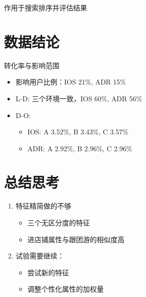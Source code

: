 \documentclass{beamer}
\begin{document}
\begin{CJK}{UTF8}{gbsn}
\begin{frame}{作用于搜索排序并评估结果}
\end{frame}

\section{数据结论}

\begin{frame}{转化率与影响范围}
  \begin{itemize}
  \item {影响用户比例：IOS 21\%, ADR 15\%}
  \item {L-D: 三个环境一致，IOS 60\%, ADR 56\%}
  \item {
    D-O:
    \begin{itemize}
    \item {IOS: A 3.52\%, B 3.43\%, C 3.57\%}
    \item {ADR: A 2.92\%, B 2.96\%, C 2.96\%}
    \end{itemize}
  }
  \end{itemize}
\end{frame}

\section*{总结思考}

\begin{frame}
  \begin{enumerate}
  \item {
    特征精简做的不够
    \begin{itemize}
    \item {三个无区分度的特征}
    \item {进店铺属性与跟团游的相似度高}
    \end{itemize}
  }
  \item {
    试验需要继续：
    \begin{itemize}
    \item { 尝试新的特征 }
    \item { 调整个性化属性的加权量 }
    \end{itemize}
  }
  \end{enumerate}
\end{frame}

\end{CJK}
\end{document}
